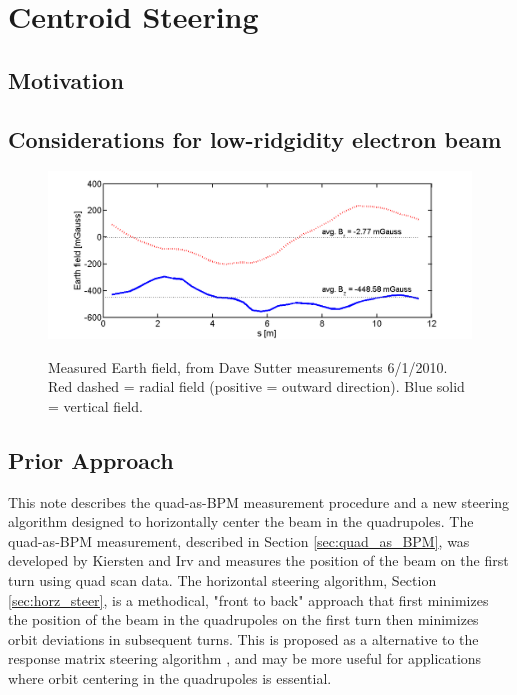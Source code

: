 
\renewcommand{\thechapter}{3}

\chapter{Centroid Steering}

\section{Motivation}



\section{Considerations for low-ridgidity electron beam}


\begin{figure}
\begin{center}
\includegraphics[width=\textwidth]{3.figures/Earth_field.png}
\end{center}
\renewcommand{\baselinestretch}{1}
\small\normalsize
\begin{quote}
\caption[Figure with caption indented]{Measured Earth field, from Dave Sutter measurements 6/1/2010. Red dashed = radial field (positive = outward direction). Blue solid = vertical field.}
\label{fig:earthfield}
\end{quote}
\end{figure} 
\renewcommand{\baselinestretch}{2}
\small\normalsize


\section{Prior Approach}


This note describes the quad-as-BPM measurement procedure and a new steering algorithm designed to horizontally center the beam in the quadrupoles. 
The quad-as-BPM measurement, described in Section \ref{sec:quad_as_BPM}, was developed by Kiersten and Irv and measures the position of the beam 
on the first turn using quad scan data. The horizontal steering algorithm, Section \ref{sec:horz_steer}, is a methodical, "front to back" approach 
that first minimizes the position of the beam in the quadrupoles on the first turn then minimizes orbit deviations in subsequent turns. This is 
proposed as a alternative to the response matrix steering algorithm \cite{KPRnote:2011}, and may be more useful for applications where orbit 
centering in the quadrupoles is essential.


